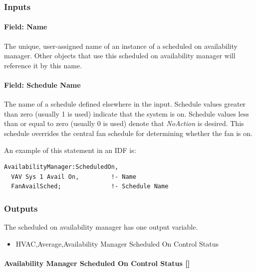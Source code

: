 \subsubsection{Inputs}\label{inputs-1-044}

\paragraph{Field: Name}\label{field-name-1-043}

The unique, user-assigned name of an instance of a scheduled on availability manager. Other objects that use this scheduled on availability manager will reference it by this name.

\paragraph{Field: Schedule Name}\label{field-schedule-name-1-003}

The name of a schedule defined elsewhere in the input. Schedule values greater than zero (usually 1 is used) indicate that the system is on. Schedule values less than or equal to zero (usually 0 is used) denote that \emph{NoAction} is desired. This schedule overrides the central fan schedule for determining whether the fan is on.

An example of this statement in an IDF is:

\begin{lstlisting}
AvailabilityManager:ScheduledOn,
  VAV Sys 1 Avail On,         !- Name
  FanAvailSched;              !- Schedule Name
\end{lstlisting}

\subsubsection{Outputs}\label{outputs-036}

The scheduled on availability manager has one output variable.

\begin{itemize}
\tightlist
\item
  HVAC,Average,Availability Manager Scheduled On Control Status
\end{itemize}

\paragraph{Availability Manager Scheduled On Control Status {[]}}\label{availability-manager-scheduled-on-control-status}

